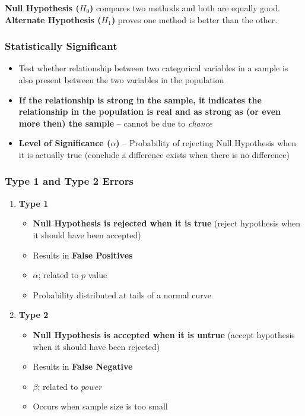 \documentclass{article}
\begin{document}
\textbf{Null Hypothesis ($H_0$)} compares two methods and both are equally good. \textbf{Alternate Hypothesis ($H_1$)} proves one method is better than the other.

\subsubsection{Statistically Significant}

\begin{itemize}
    \item Test whether relationship between two categorical variables in a sample is also present between the two variables in the population
    \item \textbf{If the relationship is strong in the sample, it indicates the relationship in the population is real and as strong as (or even more then) the sample} -- cannot be due to \textit{chance}
    \item \textbf{Level of Significance ($\alpha$)} -- Probability of rejecting Null Hypothesis when it is actually true (conclude a difference exists when there is no difference)
\end{itemize}

\subsubsection{Type 1 and Type 2 Errors}

\begin{enumerate}
    \item \textbf{Type 1}
    \begin{itemize}
        \item \textbf{Null Hypothesis is rejected when it is true} (reject hypothesis when it should have been accepted)
        \item Results in \textbf{False Positives}
        \item $\alpha$; related to $p$ value
        \item Probability distributed at tails of a normal curve
    \end{itemize}
    \item \textbf{Type 2}
    \begin{itemize}
        \item \textbf{Null Hypothesis is accepted when it is untrue} (accept hypothesis when it should have been rejected)
        \item Results in \textbf{False Negative}
        \item $\beta$; related to \textit{power}
        \item Occurs when sample size is too small
    \end{itemize}
\end{enumerate}
\end{document}
